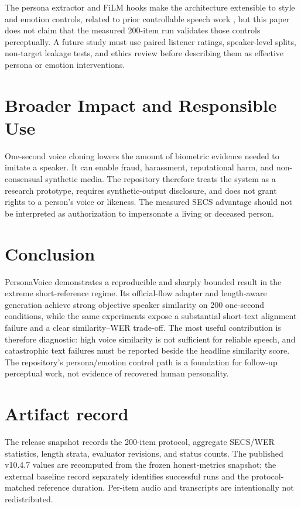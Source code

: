 \documentclass[10pt]{article}
\begin{document}
The persona extractor and FiLM hooks make the architecture extensible to
style and emotion controls, related to prior controllable speech work
\citep{wang2018style,xie-etal-2025-towards}, but this paper does not claim that the measured
200-item run validates those controls perceptually. A future study must use
paired listener ratings, speaker-level splits, non-target leakage tests, and
ethics review before describing them as effective persona or emotion
interventions.

\section{Broader Impact and Responsible Use}

One-second voice cloning lowers the amount of biometric evidence needed to
imitate a speaker. It can enable fraud, harassment, reputational harm, and
non-consensual synthetic media. The repository therefore treats the system as
a research prototype, requires synthetic-output disclosure, and does not grant
rights to a person's voice or likeness. The measured SECS advantage should not
be interpreted as authorization to impersonate a living or deceased person.

\section{Conclusion}

PersonaVoice demonstrates a reproducible and sharply bounded result in the
extreme short-reference regime. Its official-flow adapter and length-aware
generation achieve strong objective speaker similarity on 200 one-second
conditions, while the same experiments expose a substantial short-text
alignment failure and a clear similarity--WER trade-off. The most useful
contribution is therefore diagnostic: high voice similarity is not sufficient
for reliable speech, and catastrophic text failures must be reported beside
the headline similarity score. The repository's persona/emotion control path
is a foundation for follow-up perceptual work, not evidence of recovered human
personality.




\appendix
\section{Artifact record}

The release snapshot records the 200-item protocol, aggregate SECS/WER
statistics, length strata, evaluator revisions, and status counts. The
published v10.4.7 values are recomputed from the frozen honest-metrics
snapshot; the external baseline record separately identifies successful runs
and the protocol-matched reference duration. Per-item audio and transcripts
are intentionally not redistributed.
\end{document}
